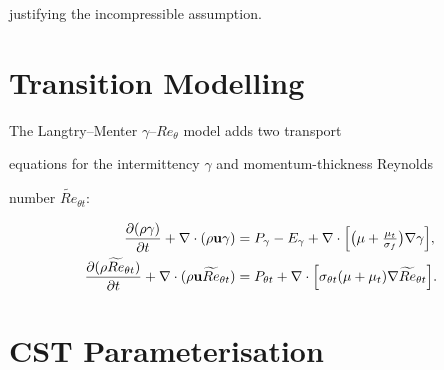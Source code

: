 \documentclass{article}
\begin{document}
justifying the incompressible assumption.




\section{Transition Modelling}




The Langtry--Menter $\gamma$--$Re_\theta$ model adds two transport

equations for the intermittency $\gamma$ and momentum-thickness Reynolds

number $\widetilde{Re}_{\theta t}$:



\begin{align}

  \frac{\partial(\rho \gamma)}{\partial t}

    + \nabla \cdot (\rho \mathbf{u} \gamma)

    &= P_\gamma - E_\gamma

       + \nabla \cdot \Bigl[\bigl(\mu + \tfrac{\mu_t}{\sigma_f}\bigr)

         \nabla \gamma\Bigr], \\

  \frac{\partial(\rho \widetilde{Re}_{\theta t})}{\partial t}

    + \nabla \cdot (\rho \mathbf{u} \widetilde{Re}_{\theta t})

    &= P_{\theta t}

       + \nabla \cdot \Bigl[

         \sigma_{\theta t}(\mu + \mu_t)\nabla\widetilde{Re}_{\theta t}

         \Bigr].

\end{align}




\section{CST Parameterisation}

\end{document}
